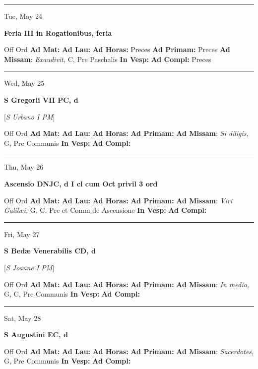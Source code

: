 \documentclass[letterpaper, 10pt]{article}
\begin{document}
\hrule
\begin{center}
Tue, May 24
\end{center}\textbf{ \large Feria III in Rogationibus, \textnormal{\normalsize feria}}
\begin{justify}
Off Ord
\textbf{Ad Mat: }
\textbf{Ad Lau: }
\textbf{Ad Horas: }Preces
\textbf{Ad Primam: }Preces
\textbf{Ad Missam}: \textit{Exaudivit,} C, Pre Paschalis
\textbf{In Vesp: }
\textbf{Ad Compl: }Preces\end{justify}



\hrule
\begin{center}
Wed, May 25
\end{center}\textbf{ \large S Gregorii VII PC, \textnormal{\normalsize d}}

[\textit{S Urbano I PM}]
\begin{justify}
Off Ord
\textbf{Ad Mat: }
\textbf{Ad Lau: }
\textbf{Ad Horas: }
\textbf{Ad Primam: }
\textbf{Ad Missam}: \textit{Si diligis,} G, Pre Communis
\textbf{In Vesp: }
\textbf{Ad Compl: }\end{justify}



\hrule
\begin{center}
Thu, May 26
\end{center}\textbf{ \large Ascensio DNJC, \textnormal{\normalsize d I cl cum Oct privil 3 ord}}
\begin{justify}
Off Ord
\textbf{Ad Mat: }
\textbf{Ad Lau: }
\textbf{Ad Horas: }
\textbf{Ad Primam: }
\textbf{Ad Missam}: \textit{Viri Galilæi,} G, C, Pre et Comm de Ascensione
\textbf{In Vesp: }
\textbf{Ad Compl: }\end{justify}



\hrule
\begin{center}
Fri, May 27
\end{center}\textbf{ \large S Bedæ Venerabilis CD, \textnormal{\normalsize d}}

[\textit{S Joanne I PM}]
\begin{justify}
Off Ord
\textbf{Ad Mat: }
\textbf{Ad Lau: }
\textbf{Ad Horas: }
\textbf{Ad Primam: }
\textbf{Ad Missam}: \textit{In medio,} G, C, Pre Communis
\textbf{In Vesp: }
\textbf{Ad Compl: }\end{justify}



\hrule
\begin{center}
Sat, May 28
\end{center}\textbf{ \large S Augustini EC, \textnormal{\normalsize d}}
\begin{justify}
Off Ord
\textbf{Ad Mat: }
\textbf{Ad Lau: }
\textbf{Ad Horas: }
\textbf{Ad Primam: }
\textbf{Ad Missam}: \textit{Sacerdotes,} G, Pre Communis
\textbf{In Vesp: }
\textbf{Ad Compl: }\end{justify}
\end{document}
